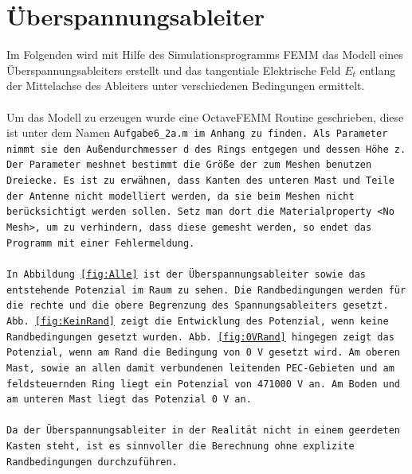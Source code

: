 
\section{Überspannungsableiter}
Im Folgenden wird mit Hilfe des Simulationsprogramms FEMM das Modell eines Überspannungsableiters erstellt und das tangentiale Elektrische Feld $E_t$ entlang der Mittelachse des Ableiters unter verschiedenen Bedingungen ermittelt. \\ \\
Um das Modell zu erzeugen wurde eine OctaveFEMM Routine geschrieben, diese ist unter dem Namen \tt{Aufgabe6\_2a.m} im Anhang zu finden. Als Parameter nimmt sie den Außendurchmesser \tt{d} des Rings entgegen und dessen Höhe \tt{z}. Der Parameter \tt{meshnet} bestimmt die Größe der zum Meshen benutzen Dreiecke. Es ist zu erwähnen, dass Kanten des unteren Mast und Teile der Antenne nicht modelliert werden, da sie beim Meshen nicht berücksichtigt werden sollen. Setz man dort die Materialproperty \tt{<No Mesh>}, um zu verhindern, dass diese gemesht werden, so endet das Programm mit einer Fehlermeldung.\\ \\
In Abbildung \ref{fig:Alle} ist der Überspannungsableiter sowie das entstehende Potenzial im Raum zu sehen. Die Randbedingungen werden für die rechte und die obere Begrenzung des Spannungsableiters gesetzt. Abb. \ref{fig:KeinRand} zeigt die Entwicklung des Potenzial, wenn keine Randbedingungen gesetzt wurden. Abb. \ref{fig:0VRand} hingegen zeigt das Potenzial, wenn am Rand die Bedingung von \SI{0}{\volt} gesetzt wird. Am oberen Mast, sowie an allen damit verbundenen leitenden PEC-Gebieten und am feldsteuernden Ring liegt ein Potenzial von \SI{471000}{\volt} an. Am Boden und am unteren Mast liegt das Potenzial \SI{0}{\volt} an. \\ \\
Da der Überspannungsableiter in der Realität nicht in einem geerdeten Kasten steht, ist es sinnvoller die Berechnung ohne explizite Randbedingungen durchzuführen. 
\newpage
